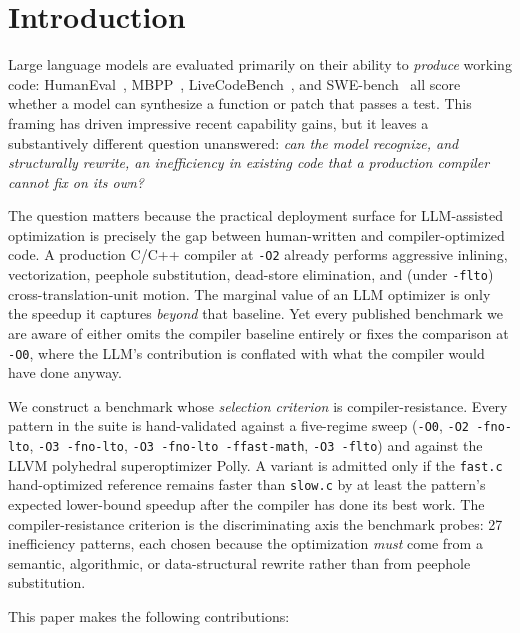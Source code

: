 \section{Introduction}

Large language models are evaluated primarily on their ability to \emph{produce} working code: HumanEval~\cite{chen2021codex}, MBPP~\cite{austin2021mbpp}, LiveCodeBench~\cite{livecodebench2024}, and SWE-bench~\cite{jimenez2024swebench} all score whether a model can synthesize a function or patch that passes a test. This framing has driven impressive recent capability gains, but it leaves a substantively different question unanswered: \emph{can the model recognize, and structurally rewrite, an inefficiency in existing code that a production compiler cannot fix on its own?}

The question matters because the practical deployment surface for LLM-assisted optimization is precisely the gap between human-written and compiler-optimized code. A production C/C++ compiler at \texttt{-O2} already performs aggressive inlining, vectorization, peephole substitution, dead-store elimination, and (under \texttt{-flto}) cross-translation-unit motion. The marginal value of an LLM optimizer is only the speedup it captures \emph{beyond} that baseline. Yet every published benchmark we are aware of either omits the compiler baseline entirely or fixes the comparison at \texttt{-O0}, where the LLM's contribution is conflated with what the compiler would have done anyway.

We construct a benchmark whose \emph{selection criterion} is compiler-resistance. Every pattern in the suite is hand-validated against a five-regime sweep (\texttt{-O0}, \texttt{-O2 -fno-lto}, \texttt{-O3 -fno-lto}, \texttt{-O3 -fno-lto -ffast-math}, \texttt{-O3 -flto}) and against the LLVM polyhedral superoptimizer Polly. A variant is admitted only if the \texttt{fast.c} hand-optimized reference remains faster than \texttt{slow.c} by at least the pattern's expected lower-bound speedup after the compiler has done its best work. The compiler-resistance criterion is the discriminating axis the benchmark probes: 27 inefficiency patterns, each chosen because the optimization \emph{must} come from a semantic, algorithmic, or data-structural rewrite rather than from peephole substitution.

This paper makes the following contributions:

